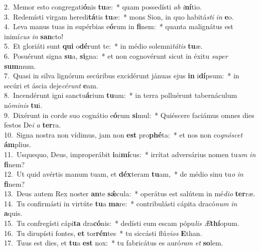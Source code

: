 {2.~}Memor esto congregati\textbf{ó}nis \textbf{tu}æ:~* quam possedísti \textit{ab} \textit{i}\textbf{ní}tio.\\
{3.~}Redemísti virgam heredi\textbf{tá}tis \textbf{tu}æ:~* mons Sion, in quo habitá\textit{sti} \textit{in} \textbf{e}o.\\
{4.~}Leva manus tuas in supérbias e\textbf{ó}rum in \textbf{fi}nem:~* quanta malignátus est inimí\textit{cus} \textit{in} \textbf{san}cto!\\
{5.~}Et gloriáti sunt \textbf{qui} o\textbf{dé}runt te:~* in médio solemni\textit{tá}\textit{tis} \textbf{tu}æ.\\
{6.~}Posuérunt signa \textbf{su}a, \textbf{si}gna:~* et non cognovérunt sicut in éxitu \textit{su}\textit{per} \textbf{sum}mum.\\
{7.~}Quasi in silva lignórum secúribus excidérunt jánuas ejus \textbf{in} i\textbf{dí}psum:~* in secúri et áscia deje\textit{cé}\textit{runt} \textbf{e}am.\\
{8.~}Incendérunt igni sanctu\textbf{á}rium \textbf{tu}um:~* in terra polluérunt tabernáculum nó\textit{mi}\textit{nis} \textbf{tu}i.\\
{9.~}Dixérunt in corde suo cognátio e\textbf{ó}rum \textbf{si}mul:~* Quiéscere faciámus omnes dies festos De\textit{i} \textit{a} \textbf{ter}ra.\\
{10.~}Signa nostra non vídimus, jam non \textbf{est} pro\textbf{phé}ta:~* et nos non co\textit{gnó}\textit{scet} \textbf{ám}plius.\\
{11.~}Usquequo, Deus, improperábit \textbf{i}ni\textbf{mí}cus:~* irrítat adversárius nomen tu\textit{um} \textit{in} \textbf{fi}nem?\\
{12.~}Ut quid avértis manum tuam, et \textbf{déx}teram \textbf{tu}am,~* de médio sinu tu\textit{o} \textit{in} \textbf{fi}nem?\\
{13.~}Deus autem Rex noster \textbf{an}te \textbf{sǽ}cula:~* operátus est salútem in mé\textit{di}\textit{o} \textbf{ter}ræ.\\
{14.~}Tu confirmásti in virtúte \textbf{tu}a \textbf{ma}re:~* contribulásti cápita dracó\textit{num} \textit{in} \textbf{a}quis.\\
{15.~}Tu confregísti cápi\textbf{ta} dra\textbf{có}nis:~* dedísti eum escam pópu\textit{lis} \textit{Æ}\textbf{thí}opum.\\
{16.~}Tu dirupísti fontes, \textbf{et} tor\textbf{rén}tes~* tu siccásti flú\textit{vi}\textit{os} \textbf{E}than.\\
{17.~}Tuus est dies, et \textbf{tu}a \textbf{est} nox:~* tu fabricátus es auró\textit{ram} \textit{et} \textbf{so}lem.\\
